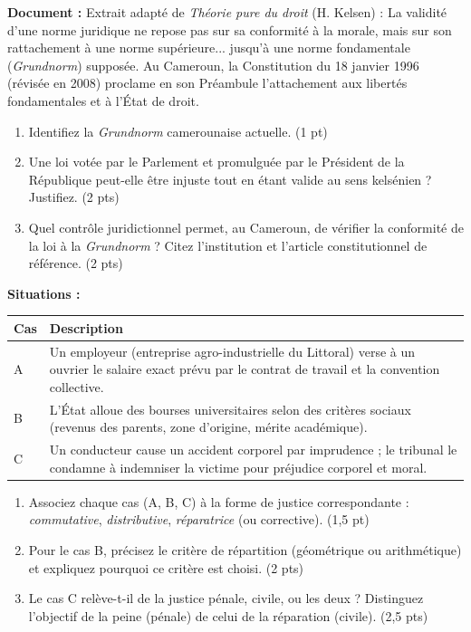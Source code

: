 \documentclass[11pt]{article}
\begin{document}
\begin{exercice}
\textbf{Document :} Extrait adapté de \textit{Théorie pure du droit} (H. Kelsen) : \og La validité d'une norme juridique ne repose pas sur sa conformité à la morale, mais sur son rattachement à une norme supérieure... jusqu'à une norme fondamentale (\textit{Grundnorm}) supposée.\fg{}
Au Cameroun, la Constitution du 18 janvier 1996 (révisée en 2008) proclame en son Préambule l'attachement aux libertés fondamentales et à l'État de droit.
\begin{enumerate}
    \item Identifiez la \textit{Grundnorm} camerounaise actuelle. (1 pt)
    \item Une loi votée par le Parlement et promulguée par le Président de la République peut-elle être \og injuste\fg{} tout en étant \og valide\fg{} au sens kelsénien ? Justifiez. (2 pts)
    \item Quel contrôle juridictionnel permet, au Cameroun, de vérifier la conformité de la loi à la \textit{Grundnorm} ? Citez l'institution et l'article constitutionnel de référence. (2 pts)
\end{enumerate}
\end{exercice}

\begin{exercice}
\textbf{Situations :}
\begin{tabularx}{\linewidth}{@{}p{3cm}X@{}}
\toprule
\textbf{Cas} & \textbf{Description} \\
\midrule
A & Un employeur (entreprise agro-industrielle du Littoral) verse à un ouvrier le salaire exact prévu par le contrat de travail et la convention collective. \\
B & L'État alloue des bourses universitaires selon des critères sociaux (revenus des parents, zone d'origine, mérite académique). \\
C & Un conducteur cause un accident corporel par imprudence ; le tribunal le condamne à indemniser la victime pour préjudice corporel et moral. \\
\bottomrule
\end{tabularx}
\begin{enumerate}
    \item Associez chaque cas (A, B, C) à la forme de justice correspondante : \textit{commutative}, \textit{distributive}, \textit{réparatrice} (ou corrective). (1,5 pt)
    \item Pour le cas B, précisez le critère de répartition (géométrique ou arithmétique) et expliquez pourquoi ce critère est choisi. (2 pts)
    \item Le cas C relève-t-il de la justice pénale, civile, ou les deux ? Distinguez l'objectif de la peine (pénale) de celui de la réparation (civile). (2,5 pts)
\end{enumerate}
\end{exercice}
\end{document}
